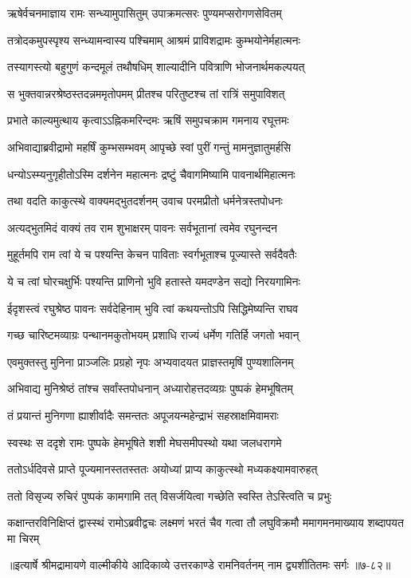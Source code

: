 
\twolineshloka
{ऋषेर्वचनमाज्ञाय रामः सन्ध्यामुपासितुम्}
{उपाक्रमत्सरः पुण्यमप्सरोगणसेवितम्} %

\twolineshloka
{तत्रोदकमुपस्पृश्य सन्ध्यामन्वास्य पश्चिमाम्}
{आश्रमं प्राविशद्रामः कुम्भयोनेर्महात्मनः} %

\twolineshloka
{तस्यागस्त्यो बहुगुणं कन्दमूलं तथौषधिम्}
{शाल्यादीनि पवित्राणि भोजनार्थमकल्पयत्} %

\twolineshloka
{स भुक्तवान्नरश्रेष्ठस्तदन्नममृतोपमम्}
{प्रीतश्च परितुष्टश्च तां रात्रिं समुपाविशत्} %

\twolineshloka
{प्रभाते काल्यमुत्थाय कृत्वाऽऽह्निकमरिन्दमः}
{ऋषिं समुपचक्राम गमनाय रघूत्तमः} %

\twolineshloka
{अभिवाद्याब्रवीद्रामो महर्षिं कुम्भसम्भवम्}
{आपृच्छे स्वां पुरीं गन्तुं मामनुज्ञातुमर्हसि} %

\twolineshloka
{धन्योऽस्म्यनुगृहीतोऽस्मि दर्शनेन महात्मनः}
{द्रष्टुं चैवागमिष्यामि पावनार्थमिहात्मनः} %

\twolineshloka
{तथा वदति काकुत्स्थे वाक्यमद्भुतदर्शनम्}
{उवाच परमप्रीतो धर्मनेत्रस्तपोधनः} %

\twolineshloka
{अत्यद्भुतमिदं वाक्यं तव राम शुभाक्षरम्}
{पावनः सर्वभूतानां त्वमेव रघुनन्दन} %

\twolineshloka
{मुहूर्तमपि राम त्वां ये च पश्यन्ति केचन}
{पाविताः स्वर्गभूताश्च पूज्यास्ते सर्वदैवतैः} %

\twolineshloka
{ये च त्वां घोरचक्षुर्भिः पश्यन्ति प्राणिनो भुवि}
{हतास्ते यमदण्डेन सद्यो निरयगामिनः} %

\twolineshloka
{ईदृशस्त्वं रघुश्रेष्ठ पावनः सर्वदेहिनाम्}
{भुवि त्वां कथयन्तोऽपि सिद्धिमेष्यन्ति राघव} %

\twolineshloka
{गच्छ चारिष्टमव्याग्रः पन्थानमकुतोभयम्}
{प्रशाधि राज्यं धर्मेण गतिर्हि जगतो भवान्} %

\twolineshloka
{एवमुक्तस्तु मुनिना प्राञ्जलिः प्रग्रहो नृपः}
{अभ्यवादयत प्राज्ञस्तमृषिं पुण्यशालिनम्} %

\twolineshloka
{अभिवाद्य मुनिश्रेष्ठं तांश्च सर्वांस्तपोधनान्}
{अध्यारोहत्तदव्यग्रः पुष्पकं हेमभूषितम्} %

\twolineshloka
{तं प्रयान्तं मुनिगणा ह्याशीर्वादैः समन्ततः}
{अपूजयन्महेन्द्राभं सहस्राक्षमिवामराः} %

\twolineshloka
{स्वस्थः स ददृशे रामः पुष्पके हेमभूषिते}
{शशी मेघसमीपस्थो यथा जलधरागमे} %

\twolineshloka
{ततोऽर्धदिवसे प्राप्ते पूज्यमानस्ततस्ततः}
{अयोध्यां प्राप्य काकुत्स्थो मध्यकक्ष्यामवारुहत्} %

\twolineshloka
{ततो विसृज्य रुचिरं पुष्पकं कामगामि तत्}
{विसर्जयित्वा गच्छेति स्वस्ति तेऽस्त्विति च प्रभुः} %

\twolineshloka
{कक्षान्तरविनिक्षिप्तं द्वास्स्थं रामोऽब्रवीद्वचः}
{लक्ष्मणं भरतं चैव गत्वा तौ लघुविक्रमौ ममागमनमाख्याय शब्दापयत मा चिरम्} %


॥इत्यार्षे श्रीमद्रामायणे वाल्मीकीये आदिकाव्ये उत्तरकाण्डे रामनिवर्तनम् नाम द्व्यशीतितमः सर्गः ॥७-८२॥
